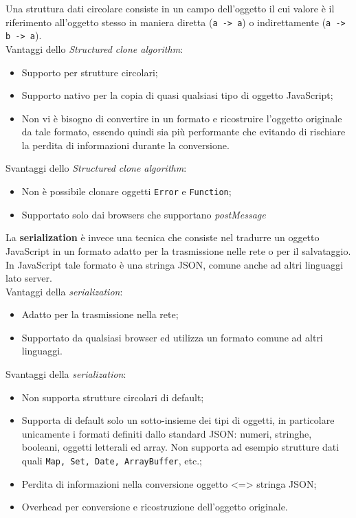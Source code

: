 Una struttura dati circolare consiste in un campo dell'oggetto il cui valore è il riferimento all'oggetto stesso in maniera diretta (\texttt{a -> a}) o indirettamente (\texttt{a -> b -> a}). \\

Vantaggi dello \textit{Structured clone algorithm}:

\begin{itemize}
    \item Supporto per strutture circolari;
    \item Supporto nativo per la copia di quasi qualsiasi tipo di oggetto JavaScript;
    \item Non vi è bisogno di convertire in un formato e ricostruire l'oggetto originale da tale formato, essendo quindi sia più performante che evitando di rischiare la perdita di informazioni durante la conversione.
\end{itemize}

Svantaggi dello \textit{Structured clone algorithm}:

\begin{itemize}
    \item Non è possibile clonare oggetti \texttt{Error} e \texttt{Function};
    \item Supportato solo dai browsers che supportano \textit{postMessage}
\end{itemize}

La \textbf{serialization} è invece una tecnica che consiste nel tradurre un oggetto JavaScript in un formato adatto per la trasmissione nelle rete o per il salvataggio. In JavaScript tale formato è una stringa JSON, comune anche ad altri linguaggi lato server. \\

Vantaggi della \textit{serialization}:

\begin{itemize}
    \item Adatto per la trasmissione nella rete;
    \item Supportato da qualsiasi browser ed utilizza un formato comune ad altri linguaggi.
\end{itemize}

Svantaggi della \textit{serialization}:

\begin{itemize}
    \item Non supporta strutture circolari di default;
    \item Supporta di default solo un sotto-insieme dei tipi di oggetti, in particolare unicamente i formati definiti dallo standard JSON: numeri, stringhe, booleani, oggetti letterali ed array. Non supporta ad esempio strutture dati quali \texttt{Map, Set, Date, ArrayBuffer}, etc.;
    \item Perdita di informazioni nella conversione oggetto <=> stringa JSON;
    \item Overhead per conversione e ricostruzione dell'oggetto originale.
\end{itemize}

